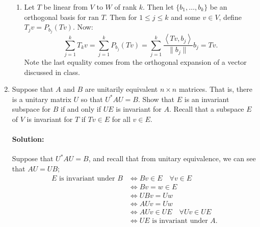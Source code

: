 \documentclass{article}
\begin{document}
\begin{enumerate}
\begin{enumerate}[label= (\alph*)]
    \item Let $T$ be linear from $V$ to $W$ of rank $k$. Then let $\{b_1,\dots,b_k\} $ be an orthogonal basis for $\text{ran }T$. Then for $1\leq j\leq k$ and some $v\in V$, define $T_jv=P_{b_j}(Tv)$. Now:
        \[
            \sum_{j=1}^{k} T_k v=\sum_{j=1}^{k} P_{b_j}(Tv)=\sum_{j=1}^{k} \frac{\left<Tv,b_j \right>}{\|b_j\|}b_j=Tv
        .\] 
        Note the last equality comes from the orthogonal expansion of a vector discussed in class.%
\end{enumerate}
\newpage

\item Suppose that $A$ and $B$ are unitarily equivalent $n \times n$ matrices. That is, there is a unitary matrix $U$ so that $U^*AU = B$. Show that $E$ is an invariant subspace for $B$ if and only if $UE$ is invariant for $A$.
Recall that a subspace $E$ of $V$ is invariant for $T$ if $Tv \in E$ for all $v \in E$.
\paragraph{Solution: }Suppose that $ U^* AU=B$, and recall that from unitary equivalence, we can see that $AU=UB$;
\begin{align*}
    E \text{ is invariant under }B&\iff Bv\in E\quad\forall v\in E\\
                        &\iff Bv=w\in E\\
                         &\iff UBv=Uw\\
                         &\iff AUv=Uw\\
                         &\iff AUv\in UE\quad \forall Uv\in UE\\
                         &\iff  UE \text{ is invariant under } A
.\end{align*}
\end{enumerate}
\end{document}

